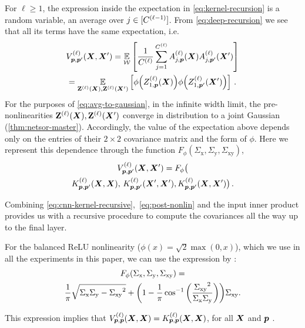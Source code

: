 \documentclass[accepted]{uai2021} %
\newcommand{\Sigmax}{{\Sigma_{\text{x}}}}
\newcommand{\Sigmay}{{\Sigma_{\text{y}}}}
\newcommand{\Sigmaxy}{{\Sigma_{\text{xy}}}}
\newcommand{\layerAd}[2]{\mathbf{Z}^{(#1)}_{#2}(\vX')}
\newcommand{\layerAsd}[2]{Z^{(#1)}_{#2}(\vX')}
\newcommand{\layerAs}[2]{Z^{(#1)}_{#2}(\vX)}
\newcommand{\layerA}[2]{\mathbf{Z}^{(#1)}_{#2}(\mX)}
\newcommand{\layerC}[1]{C^{(#1)}}
\newcommand{\layerNLAsd}[2]{A^{(#1)}_{#2}(\vX')}
\newcommand{\layerNLAs}[2]{A^{(#1)}_{#2}(\vX)}
\newcommand{\prevchan}{j}   %
\newcommand{\patch}{\vp}               %
\newcommand{\covf}[1]{K\ssup{#1}}
\newcommand{\nlinf}[1]{V\ssup{#1}}
\newcommand{\0}{\boldsymbol{0}}
\newcommand{\1}{\boldsymbol{1}}
\newcommand{\crefp}[1]{(\cref{#1})}
\begin{document}
For $\ell\ge 1$, the expression inside the expectation in \cref{eq:kernel-recursion} is a random variable, an average over $\prevchan\in\countto{\layerC{\ell-1}}$. From \cref{eq:deep-recursion} we see that all its terms have the same expectation, i.e.
\begin{multline}
\nlinf{\ell}_{\patch,\patch'}\bra{\mX,\mX'}
= \Expect{\gW}{\frac{1}{\layerC{\ell}} \sum_{\prevchan=1}^{\layerC{\ell}} \layerNLAs{\ell}{\prevchan,\patch} \layerNLAsd{\ell}{\prevchan,\patch'}} \\
= \Expect{ \layerA{\ell}{}, \layerAd{\ell}{} }{\phi\bra{\layerAs{\ell}{1,\patch}} \phi\bra{\layerAsd{\ell}{1,\patch'}}}\,.
\label{eq:avg-to-gaussian}
\end{multline}
For the purposes of \cref{eq:avg-to-gaussian}, in the infinite width limit, the
pre-nonlinearities $\layerA{\ell}{},\layerAd{\ell}{}$ converge in distribution to a joint Gaussian
\crefp{thm:netsor-master}. Accordingly, the value of the expectation above depends only on the entries of their $2\times 2$ covariance matrix and the form of $\phi$. Here we represent this dependence through the function $F_{\phi}(\Sigmax, \Sigmay, \Sigmaxy)$,
\begin{multline}
\nlinf{\ell}_{\patch,\patch'}\bra{\mX,\mX'}
=F_{\phi}\big(\\
\covf{\ell}_{\patch,\patch'}\bra{\mX, \mX},\,\covf{\ell}_{\patch,\patch'}\bra{\mX', \mX'},
\covf{\ell}_{\patch,\patch'}\bra{\mX, \mX'}\big)\,.
\label{eq:post-nonlin}
\end{multline}

Combining \cref{eq:cnn-kernel-recursive},~\ref{eq:post-nonlin} and the input inner product
provides us with a recursive procedure to compute the covariances all the way up to the final layer.

For the balanced ReLU nonlinearity ($\phi(x) = \sqrt{2}\max(0, x)$), which we
use in all the experiments in this paper, we can use the expression by \citet{cho2009mkm}:
\begin{multline}
  F_{\phi}\bra{\Sigmax, \Sigmay, \Sigmaxy} = \\\frac{1}{\pi} \sqrt{\Sigmax\Sigmay - \Sigmaxy^{2}} + \bra{1 - \frac{1}{\pi}\cos^{-1}\bra{\frac{\Sigmaxy^{2}}{\Sigmax\Sigmay}}} \Sigmaxy.
\end{multline}

This expression implies that
$\nlinf{\ell}_{\patch,\patch}\bra{\mX,\mX} = \covf{\ell}_{\patch,\patch}\bra{\mX,\mX}$,
for all ${\bm{X}}$ and $\patch$ \citep{lee2018dnnlimit,matthews2018dnnlimit}.
\end{document}
